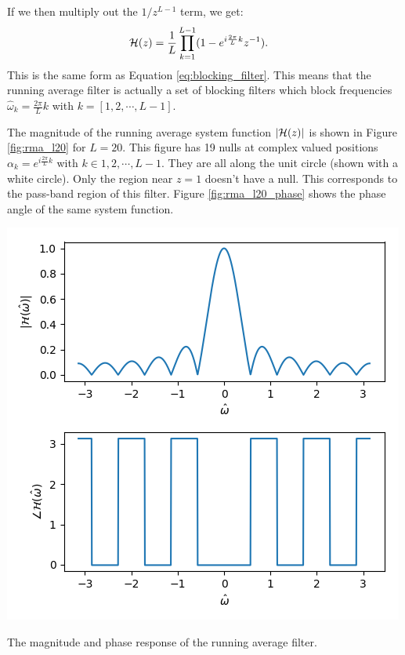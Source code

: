If we then multiply out the $1/z^{L-1}$ term, we get:
\begin{align}
\mathcal{H}(z) &= \frac{1}{L} \prod_{k=1}^{L-1}(1-e^{i\frac{2\pi}{L}k}z^{-1}).
\end{align}
This is the same form as Equation \ref{eq:blocking_filter}. This means
that the running average filter is actually a set of blocking filters
which block frequencies $\hat{\omega}_k=\frac{2\pi}{L}k$ with
$k=[1,2,\cdots,L-1]$. 

The magnitude of the running average system function $|\mathcal{H}(z)|$ is shown
in Figure \ref{fig:rma_l20} for $L=20$. This figure has 19 nulls at
complex valued positions $\alpha_k=e^{i\frac{2\pi}{L}k}$ with $k\in
{1,2,\cdots,L-1}$. They are all along the unit circle (shown with a
white circle). Only the region near $z=1$ doesn't have a null. This
corresponds to the pass-band region of this filter. Figure
\ref{fig:rma_l20_phase} shows the phase angle of the same system
function.
\begin{marginfigure}
\begin{center}
\includegraphics[width=\textwidth]{code/025_system_function/rma_magresp.png}
\end{center}
\caption{The magnitude and phase response of the running average filter.}
\label{fig:magresp}
\end{marginfigure}


